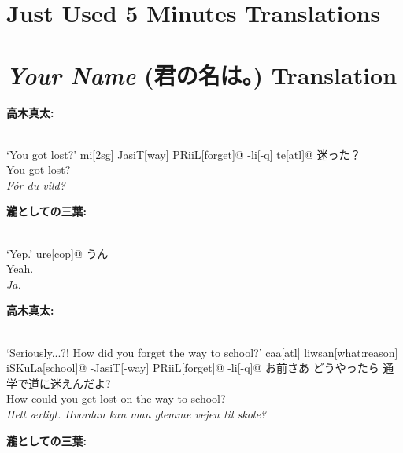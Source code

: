 
\chapter{Just Used 5 Minutes Translations}


\chapter{\textit{Your Name} (君の名は。) Translation}

\begin{paracol}{2}
\hfill \textbf{高木真太:}

\switchcolumn

\exdisplay[lingstyle=Conversation]
\begingl 
\glpreamble
\textbf{}\\
`You got lost?'
\endpreamble
mi[\sc 2sg]
JasiT[way]
PRiiL[forget]@
-li[\sc -q]
te[\sc atl]@
\glft
迷った？\\
You got lost?\\
\textit{Fór du vild?}
\endgl
\xe

\bigskip
\switchcolumn*
\hfill \textbf{瀧としての三葉:}

\switchcolumn

\exdisplay[lingstyle=Conversation]
\begingl 
\glpreamble
\textbf{}\\
`Yep.'
\endpreamble
ure[\sc cop]@
\glft
うん\\
Yeah.\\
\textit{Ja.}
\endgl
\xe

\bigskip
\switchcolumn*
\hfill \textbf{高木真太:}

\switchcolumn

\exdisplay[lingstyle=Conversation]
\begingl 
\glpreamble
\textbf{}\\
`Seriously...?! How did you forget the way to school?'
\endpreamble
caa[\sc atl]
liwsan[what:reason]
iSKuLa[school]@
-JasiT[-way]
PRiiL[forget]@
-li[\sc -q]@
\glft
お前さあ どうやったら 通学で道に迷えんだよ?\\
How could you get lost on the way to school?\\
\textit{Helt ærligt. Hvordan kan man glemme vejen til skole?}
\endgl
\xe

\bigskip
\switchcolumn*
\hfill \textbf{瀧としての三葉:}


\end{paracol}
